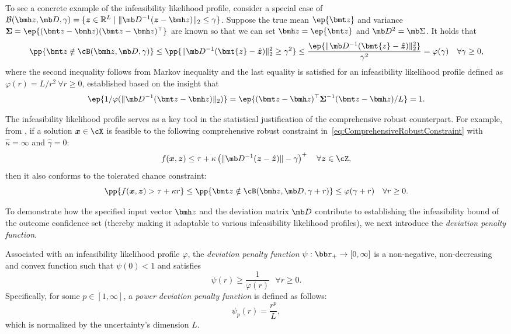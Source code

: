 \documentclass[mnsc, nonblindrev]{informswp}
\newcommand{\1}[1]{\mathds{1}{\left(#1\right)}}
\begin{document}
To see a concrete example of the infeasibility likelihood profile, consider a special case of $\mathcal{B}(\bmh z, \mb D, \gamma) = \{ \bm z \in \mathbb{R}^L \;|\; \| \mb D^{-1} (\bm z - \bmh z) \|_2 \leq \gamma \}$. Suppose the true mean $\ep{\bmt z}$ and variance $\bm \Sigma = \ep{(\bmt z - \bmh z)(\bmt z - \bmh z)^\top}$ are known so that we can set $\bmh z = \ep{\bmt z}$ and $\mb D^2 = \mb \Sigma$. It holds that
$$
\pp{\bmt z \notin \cB(\bmh z, \mb D, \gamma)} \leq  \pp{\|\mb D^{-1} (\bmt{z} - \hat{\bm{z}})\|^2_2 \geq \gamma^2} \leq \frac{\ep{\|\mb D^{-1} (\bmt{z} - \hat{\bm{z}})\|^2_2}}{\gamma^2} = \varphi(\gamma) ~~~\forall \gamma \geq 0,
$$
where the second inequality follows from Markov inequality and the last equality is satisfied for an infeasibility likelihood profile defined as $\varphi(r) = L/r^2 ~\forall r\geq 0$, established based on the insight that 
$$
\ep{1/ \varphi(\|\mb D^{-1}(\bmt z - \bmh z)\|_2) } = \ep{(\bmt z - \bmh z)^\top \bm \Sigma^{-1}(\bmt z - \bmh z)/L} = 1.
$$

The infeasibility likelihood profile serves as a key tool in the statistical justification of the comprehensive robust counterpart. For example, from , if a solution $\bm x \in \cX$ is feasible to the following comprehensive robust constraint in~\eqref{eq:ComprehensiveRobustConstraint} with $\hat \kappa = \infty$ and $\hat \gamma = 0$:
$$
f(\bm x,\bm z) \leq \tau + \kappa  \left(\|\mb D^{-1} (\bm{z} - \hat{\bm{z}})\| -\gamma \right)^+ ~~~\forall \bm z \in \cZ,
$$
then it also conforms to the tolerated chance constraint:
$$
\pp{f(\bm x,\bm z) > \tau + \kappa r} \leq \pp{\bmt z \notin \cB(\bmh z,\mb D, \gamma + r)} \leq \varphi(\gamma + r) \quad \forall r \geq 0.
$$

To demonstrate how the specified input vector $\bmh z$ and the deviation matrix $\mb D$ contribute to establishing the infeasibility bound of the outcome confidence set (thereby making it adaptable to various infeasibility likelihood profiles), we next introduce the \textit{deviation penalty function}. 

\begin{definition}
\textnormal{
Associated with an infeasibility likelihood profile $\varphi$, the \textit{deviation penalty function} $ \psi:\bbr_+ \rightarrow [0,\infty]$ is a non-negative, non-decreasing and convex function such that $\psi(0)<1$ and satisfies
$$
\psi(r) \geq \frac{1}{\varphi(r)} ~~~\forall r \geq 0.
$$
Specifically, for some $p \in [1,\infty]$, a \textit{power deviation penalty function} is defined as follows:
$$
\psi_p(r) = \frac{r^p}{L},
$$
which is normalized by the uncertainty's dimension $L$.
}
\end{definition}
\end{document}
